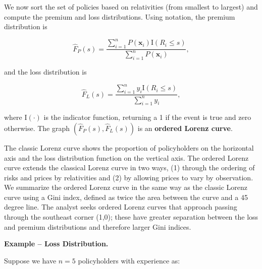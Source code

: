 \documentclass[]{book}
\theoremstyle{definition}
\theoremstyle{definition}
\theoremstyle{definition}
\theoremstyle{remark}
\begin{document}
We now sort the set of policies based on relativities (from smallest to
largest) and compute the premium and loss distributions. Using notation,
the premium distribution is

\begin{equation}\label{E:EmpPremDF}
\hat{F}_P(s) =  \frac{ \sum_{i=1}^n
P(\mathbf{x}_i) \mathrm{I}(R_i \leq s) }{\sum_{i=1}^n P(\mathbf{x}_i)} ,
\end{equation}

and the loss distribution is

\begin{equation}\label{E:EmpLossDF}
\hat{F}_{L}(s) =  \frac{ \sum_{i=1}^n y_i \mathrm{I}(R_i
\leq s) }{\sum_{i=1}^n y_i} ,
\end{equation}

where \(\mathrm{I}(\cdot)\) is the indicator function, returning a 1 if
the event is true and zero otherwise. The graph
\(\left(\hat{F}_P(s),\hat{F}_{L}(s) \right)\) is an \textbf{ordered
Lorenz curve}.

The classic Lorenz curve shows the proportion of policyholders on the
horizontal axis and the loss distribution function on the vertical axis.
The ordered Lorenz curve extends the classical Lorenz curve in two ways,
(1) through the ordering of risks and prices by relativities and (2) by
allowing prices to vary by observation. We summarize the ordered Lorenz
curve in the same way as the classic Lorenz curve using a Gini index,
defined as twice the area between the curve and a 45 degree line. The
analyst seeks ordered Lorenz curves that approach passing through the
southeast corner (1,0); these have greater separation between the loss
and premium distributions and therefore larger Gini indices.

\textbf{Example -- Loss Distribution.}

Suppose we have \(n=5\) policyholders with experience as:
\end{document}

